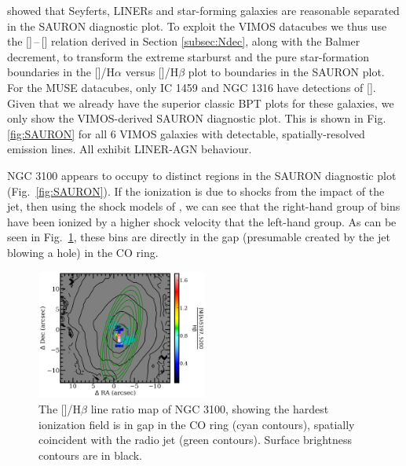 		\citet{Sarzi2010} showed that Seyferts, LINERs and star-forming galaxies are reasonable separated in the SAURON diagnostic plot. To exploit the VIMOS datacubes we thus use the []\,--\,[] relation derived in Section \ref{subsec:Ndec}, along with the Balmer decrement, to transform the \citet{Kewley2001} extreme starburst and the \citet{Kauffmann2003a} pure star-formation boundaries in the []/H$\alpha$ versus []/H$\beta$ plot to boundaries in the SAURON plot. For the MUSE datacubes, only IC 1459 and NGC 1316 have detections of []. Given that we already have the superior classic BPT plots for these galaxies, we only show the VIMOS-derived SAURON diagnostic plot. This is shown in Fig.\,\ref{fig:SAURON} for all 6 VIMOS galaxies with detectable, spatially-resolved emission lines. All exhibit LINER-AGN behaviour.

		NGC 3100 appears to occupy to distinct regions in the SAURON diagnostic plot (Fig.\ \ref{fig:SAURON}). If the ionization is due to shocks from the impact of the jet, then using the shock models of \citet{Allen2008}, we can see that the right-hand group of bins have been ionized by a higher shock velocity that the left-hand group. As can be seen in Fig.\ \ref{fig:ngc3100_NI_Hb}, these bins are directly in the gap (presumable created by the jet blowing a hole) in the CO ring.

		\begin{figure}
			\centering
			\includegraphics[width=0.5\textwidth]{chapter5/vimos/ngc3100_NI_Hb.png}
			\caption[NGC 3100 /H$\beta$ line ratio map]{The []/H$\beta$ line ratio map of NGC 3100, showing the hardest ionization field is in gap in the CO ring (cyan contours), spatially coincident with the radio jet (green contours). Surface brightness contours are in black.}
			\label{fig:ngc3100_NI_Hb}
		\end{figure}
 
